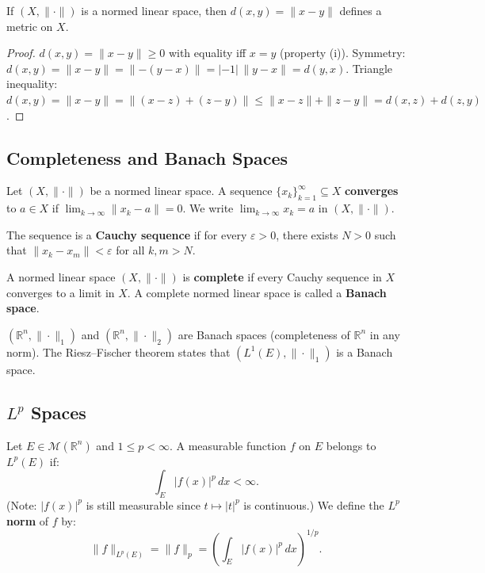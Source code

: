 \documentclass[11pt]{report}
\begin{document}
\begin{propbox}
If $(X, \|\cdot\|)$ is a normed linear space, then $d(x, y) = \|x - y\|$ defines a metric on $X$.
\end{propbox}

\begin{proof}
$d(x, y) = \|x - y\| \geq 0$ with equality iff $x = y$ (property (i)). Symmetry: $d(x, y) = \|x - y\| = \|{-(y - x)}\| = |{-1}|\,\|y - x\| = d(y, x)$. Triangle inequality: $d(x, y) = \|x - y\| = \|(x - z) + (z - y)\| \leq \|x - z\| + \|z - y\| = d(x, z) + d(z, y)$.
\end{proof}

\subsection{Completeness and Banach Spaces}

\begin{defbox}
Let $(X, \|\cdot\|)$ be a normed linear space. A sequence $\{x_k\}_{k=1}^{\infty} \subseteq X$ \textbf{converges} to $a \in X$ if $\lim_{k \to \infty} \|x_k - a\| = 0$. We write $\lim_{k \to \infty} x_k = a$ in $(X, \|\cdot\|)$.

The sequence is a \textbf{Cauchy sequence} if for every $\varepsilon > 0$, there exists $N > 0$ such that $\|x_k - x_m\| < \varepsilon$ for all $k, m > N$.
\end{defbox}

\begin{defbox}
A normed linear space $(X, \|\cdot\|)$ is \textbf{complete} if every Cauchy sequence in $X$ converges to a limit in $X$. A complete normed linear space is called a \textbf{Banach space}.
\end{defbox}

\begin{exbox}
$(\mathbb{R}^n, \|\cdot\|_1)$ and $(\mathbb{R}^n, \|\cdot\|_2)$ are Banach spaces (completeness of $\mathbb{R}^n$ in any norm). The Riesz--Fischer theorem states that $(L^1(E), \|\cdot\|_1)$ is a Banach space.
\end{exbox}

\subsection{$L^p$ Spaces}

\begin{defbox}[$L^p$ Space]
Let $E \in \mathcal{M}(\mathbb{R}^n)$ and $1 \leq p < \infty$. A measurable function $f$ on $E$ belongs to $L^p(E)$ if:
\[
\int_E |f(x)|^p\,dx < \infty.
\]
(Note: $|f(x)|^p$ is still measurable since $t \mapsto |t|^p$ is continuous.) We define the $L^p$ \textbf{norm} of $f$ by:
\[
\|f\|_{L^p(E)} = \|f\|_p = \left(\int_E |f(x)|^p\,dx\right)^{1/p}.
\]
\end{defbox}
\end{document}
